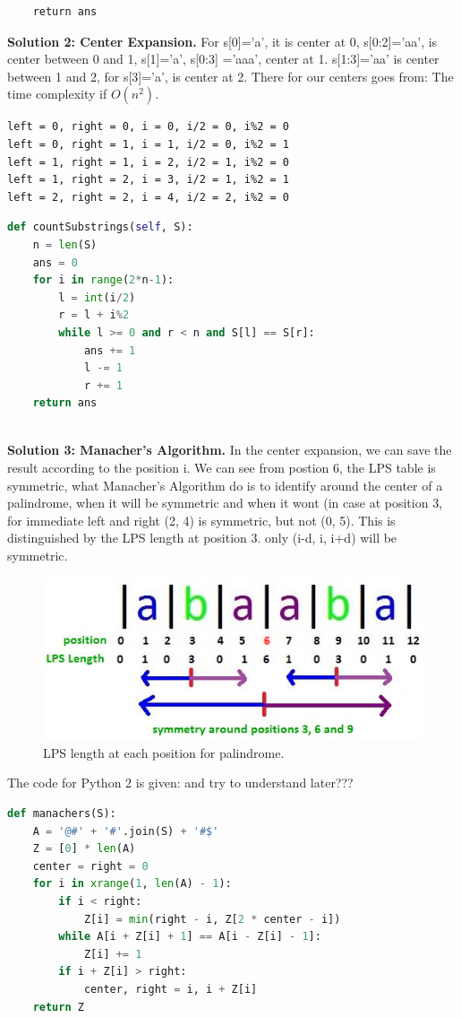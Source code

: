 \documentclass[../main.tex]{subfiles}
\begin{document}
\begin{examples}[resume]
\begin{lstlisting}
    return ans
\end{lstlisting}
\textbf{Solution 2: Center Expansion.} For s[0]='a', it is center at 0, s[0:2]='aa', is center between 0 and 1, s[1]='a', s[0:3] ='aaa', center at 1.  s[1:3]='aa' is center between 1 and 2, for s[3]='a', is center at 2. There for our centers goes from: The time complexity if $O(n^2)$.
\begin{lstlisting}[numbers =none]
left = 0, right = 0, i = 0, i/2 = 0, i%2 = 0
left = 0, right = 1, i = 1, i/2 = 0, i%2 = 1
left = 1, right = 1, i = 2, i/2 = 1, i%2 = 0
left = 1, right = 2, i = 3, i/2 = 1, i%2 = 1
left = 2, right = 2, i = 4, i/2 = 2, i%2 = 0
\end{lstlisting}
\begin{lstlisting}[language=Python]
def countSubstrings(self, S):
    n = len(S)
    ans = 0
    for i in range(2*n-1): 
        l = int(i/2)
        r = l + i%2
        while l >= 0 and r < n and S[l] == S[r]:
            ans += 1
            l -= 1
            r += 1
    return ans
                
\end{lstlisting}
\textbf{Solution 3: Manacher’s Algorithm.} In the center expansion, we can save the result according to the position i. We can see from postion 6, the LPS table is symmetric, what Manacher's Algorithm do is to identify around the center of a palindrome, when it will be symmetric and when it wont (in case at position 3, for immediate left and right (2, 4) is symmetric, but not (0, 5). This is distinguished by the LPS length at position 3. only (i-d, i, i+d) will be symmetric.
\begin{figure}
    \centering
    \includegraphics[width=0.7\columnwidth]{fig/ltlp1.png}
    \caption{LPS length at each position for palindrome. }
    \label{fig:ltlp}
\end{figure}
The code for Python 2 is given: and try to understand later???
\begin{lstlisting}[language = Python]
def manachers(S):
    A = '@#' + '#'.join(S) + '#$'
    Z = [0] * len(A)
    center = right = 0
    for i in xrange(1, len(A) - 1):
        if i < right:
            Z[i] = min(right - i, Z[2 * center - i])
        while A[i + Z[i] + 1] == A[i - Z[i] - 1]:
            Z[i] += 1
        if i + Z[i] > right:
            center, right = i, i + Z[i]
    return Z


\end{lstlisting}
\end{examples}
\end{document}
